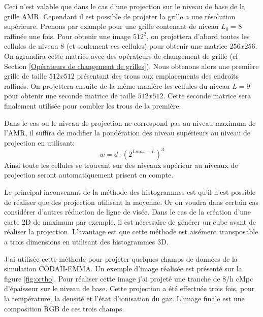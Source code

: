 Ceci n'est valable que dans le cas d'une projection sur le niveau de base de la grille \ac{AMR}.
Cependant il est possible de projeter la grille a une résolution supérieure.
Prenons par example pour une grille contenant de niveau $L_{0}=8$ raffinée une fois.
Pour obtenir une image $512^2$, on projettera d'abord toutes les cellules de niveau 8 (et seulement ces cellules) pour obtenir une matrice $256x256$.
On agrandira cette matrice avec des opérateurs de changement de grille (cf Section \ref{Opérateurs de changement de grilles}).
Nous obtenons alors une première grille de taille $512x512$ présentant des trous aux emplacements des endroits raffinés.
On projettera ensuite de la même manière les cellules du niveau $L=9$ pour obtenir une seconde matrice de taille $512x512$.
Cette seconde matrice sera finalement utilisée pour combler les trous de la première.

Dans le cas ou le niveau de projection ne correspond pas au niveau maximum de l'\ac{AMR}, il suffira de modifier la pondération des niveau supérieurs au niveau de projection en utilisant:
\begin{equation}
w = d \cdot \left( 2^{Lmax-L} \right)^3
\end{equation}
Ainsi toute les cellules se trouvant sur des niveaux supérieur au niveaux de projection seront automatiquement prisent en compte.

Le principal inconvenant de la méthode des histogrammes est qu'il n'est possible de réaliser que des projection utilisant la moyenne.
Or on voudra dans certain cas considérer d'autres réduction de ligne de visée.
Dans le cas de la création d'une carte 2D de maximum par exemple, il est nécessaire de générer un cube avant de réaliser la projection.
L'avantage est que cette méthode est aisément transposable a trois dimensions en utilisant des histogrammes 3D.




J'ai utilisée cette méthode pour projeter quelques champs de données de la simulation CODAII-EMMA.
Un exemple d'image réalisée est présenté sur la figure \ref{fig:ortho}.
Pour réaliser cette image j'ai projeté une tranche de 8/h cMpc d'épaisseur sur le niveau de base.
Cette projection a été effectuée trois fois, pour la température, la densité et l'état d'ionisation du gaz.
L'image finale est une composition \ac{RGB} de ces trois champs.

